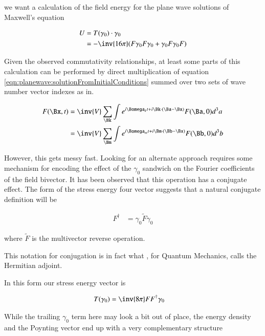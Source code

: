 we want a calculation of the field energy for the plane wave solutions of Maxwell's equation

\begin{align*}
U
&= T(\gamma_0) \cdot \gamma_0 \\
&= -\inv{16 \pi} ( F \gamma_0 F \gamma_0 + \gamma_0 F \gamma_0 F )
\end{align*}

Given the
observed commutativity relationships, at
least some parts of this calculation can be performed by direct multiplication of
equation \ref{eqn:planewave:solutionFromInitialConditions} summed over two sets of wave
number vector indexes as in.

\begin{align*}
F(\Bx,t)
&= \inv{V} \sum_{\Bk} \int e^{i \Bomega_k t + i \Bk \cdot (\Ba-\Bx) } F(\Ba, 0) d^3 a \\
&= \inv{V} \sum_{\Bm} \int e^{i \Bomega_m t + i \Bm \cdot (\Bb-\Bx) } F(\Bb, 0) d^3 b
\end{align*}

However, this gets messy fast.  Looking for an alternate approach requires some mechanism for encoding the effect
of the $\gamma_0$ sandwich on the Fourier coefficients of the field bivector.  It has been observed that this operation has a conjugate
effect.  The form of the stress energy four vector suggests that a natural conjugate definition will be

\begin{align}
F^\dagger &= \gamma_0 \tilde{F} \gamma_0
\end{align}

where $\tilde{F}$ is the multivector reverse operation.

This notation for conjugation is in fact what 
, for Quantum Mechanics, \cite{doran2003gap} calls the Hermitian adjoint.

In this form our stress energy vector is

\begin{align}
T(\gamma_0) &= \inv{8 \pi} F F^\dagger \gamma_0
\end{align}

While the trailing $\gamma_0$ term here may look a bit out of place,
the energy density and the Poynting vector end up with a very complementary structure

